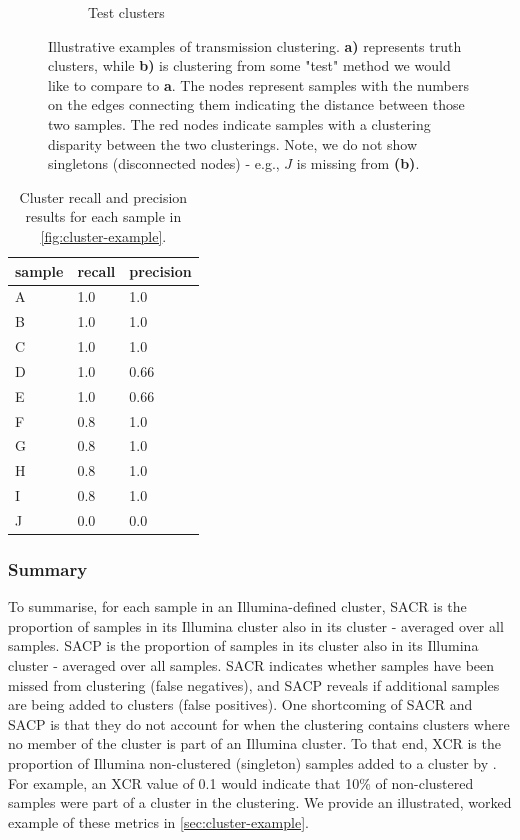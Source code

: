 \begin{figure}
\begin{subfigure}[b]{0.4\textwidth}
         \caption{Test clusters}
         \label{fig:example-test}
     \end{subfigure}
        \caption{Illustrative examples of transmission clustering. \textbf{a)} represents truth clusters, while \textbf{b)} is clustering from some "test" method we would like to compare to \textbf{a}. The nodes represent samples with the numbers on the edges connecting them indicating the distance between those two samples. The red nodes indicate samples with a clustering disparity between the two clusterings. Note, we do not show singletons (disconnected nodes) - e.g., $J$ is missing from \textbf{(b)}.}
        \label{fig:cluster-example}
\end{figure}

\begin{table}
\centering
\begin{tabular}{@{}lll@{}}
\toprule
sample & recall & precision \\ \midrule
A      & 1.0    & 1.0       \\
B      & 1.0    & 1.0       \\
C      & 1.0    & 1.0       \\
D      & 1.0    & 0.66      \\
E      & 1.0    & 0.66      \\
F      & 0.8    & 1.0       \\
G      & 0.8    & 1.0       \\
H      & 0.8    & 1.0       \\
I      & 0.8    & 1.0       \\
J      & 0.0    & 0.0       \\ \bottomrule
\end{tabular}
\caption{Cluster recall and precision results for each sample in \autoref{fig:cluster-example}.}
\label{tab:cluster-example}
\end{table}

\subsubsection{Summary}

To summarise, for each sample in an Illumina-defined cluster, SACR is the proportion of samples in its Illumina cluster also in its \ont{} cluster - averaged over all samples. SACP is the proportion of samples in its \ont{} cluster also in its Illumina cluster - averaged over all samples. SACR indicates whether samples have been missed from \ont{} clustering (false negatives), and SACP reveals if additional samples are being added to \ont{} clusters (false positives). One shortcoming of SACR and SACP is that they do not account for when the \ont{} clustering contains clusters where no member of the cluster is part of an Illumina cluster. To that end, XCR is the proportion of Illumina non-clustered (singleton) samples added to a cluster by \ont{}. For example, an XCR value of 0.1 would indicate that 10\% of non-clustered samples were part of a cluster in the \ont{} clustering. We provide an illustrated, worked example of these metrics in \autoref{sec:cluster-example}.

